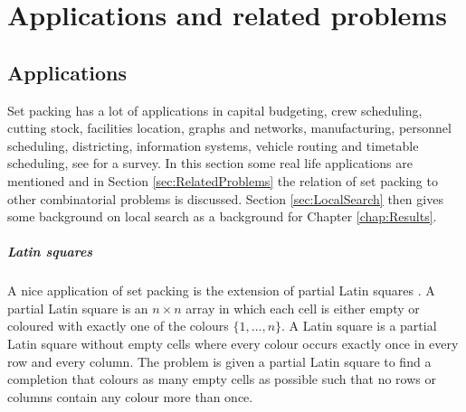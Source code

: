 \chapter{Applications and related problems}\label{chap:Applications}

\section{Applications}\label{sec:Applications}

Set packing has a lot of applications in capital budgeting, crew scheduling, cutting stock, facilities location, graphs and networks, manufacturing, personnel scheduling, districting, information systems, vehicle routing and timetable scheduling, see \cite{Applications} for a survey. In this section some real life applications are mentioned and in Section \ref{sec:RelatedProblems} the relation of set packing to other combinatorial problems is discussed. Section \ref{sec:LocalSearch} then gives some background on local search as a background for Chapter \ref{chap:Results}.


\paragraph{Latin squares} A nice application of set packing is the extension of partial Latin squares \cite{LatinSquare1,LatinSquare2}. A partial Latin square is an $n \times n$ array in which each cell is either empty or coloured with exactly one of the colours $\{1,\ldots,n\}$. A Latin square is a partial Latin square without empty cells where every colour occurs exactly once in every row and every column. The problem is given a partial Latin square to find a completion that colours as many empty cells as possible such that no rows or columns contain any colour more than once.


